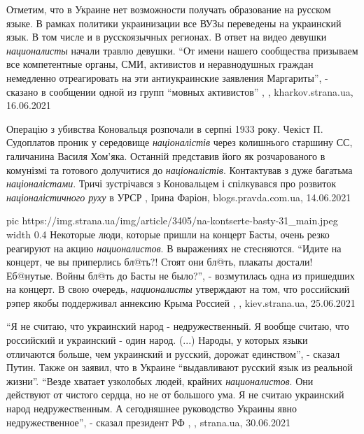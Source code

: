 Отметим, что в Украине нет возможности получать образование на русском языке. В
рамках политики украинизации все ВУЗы переведены на украинский язык. В том
числе и в русскоязычных регионах.  В ответ на видео девушки \emph{националисты} начали
травлю девушки.  \enquote{От имени нашего сообщества призываем все компетентные органы,
СМИ, активистов и неравнодушных граждан немедленно отреагировать на эти
антиукраинские заявления Маргариты}, - сказано в сообщении одной из групп
\enquote{мовных активистов}
, , kharkov.strana.ua, 16.06.2021

Операцію з убивства Коновальця розпочали в серпні 1933 року. Чекіст П.
Судоплатов проник у середовище \emph{націоналістів} через колишнього старшину СС,
галичанина Василя Хом'яка. Останній представив його як розчарованого в
комунізмі та готового долучитися до \emph{націоналістів}. Контактував з дуже багатьма
\emph{націоналістами}. Тричі зустрічався з Коновальцем і спілкувався про розвиток
\emph{націоналістичного руху} в УРСР
, 
Ірина Фаріон, blogs.pravda.com.ua, 14.06.2021

\ifcmt
  pic https://img.strana.ua/img/article/3405/na-kontserte-basty-31_main.jpeg
  width 0.4
\fi
Некоторые люди, которые пришли на концерт Басты, очень резко реагируют на акцию
\emph{националистов}. В выражениях не стесняются.  \enquote{Идите на концерт, че вы приперлись
бл@ть?! Стоят они бл@ть, плакаты достали! Еб@нутые. Войны бл@ть до Басты не
было?}, - возмутилась одна из пришедших на концерт.  В свою очередь,
\emph{националисты} утверждают на том, что российский рэпер якобы поддерживал аннексию
Крыма Россией
, , kiev.strana.ua, 25.06.2021

\enquote{Я не считаю, что украинский народ - недружественный. Я вообще считаю,
что российский и украинский - один народ. (...) Народы, у которых языки
отличаются больше, чем украинский и русский, дорожат единством}, - сказал
Путин.  Также он заявил, что в Украине \enquote{выдавливают русский язык из
реальной жизни}.  \enquote{Везде хватает узколобых людей, крайних
\emph{националистов}. Они действуют от чистого сердца, но не от большого ума. Я
не считаю украинский народ недружественным. А сегодняшнее руководство Украины
явно недружественное}, - сказал президент РФ
, , strana.ua, 30.06.2021



